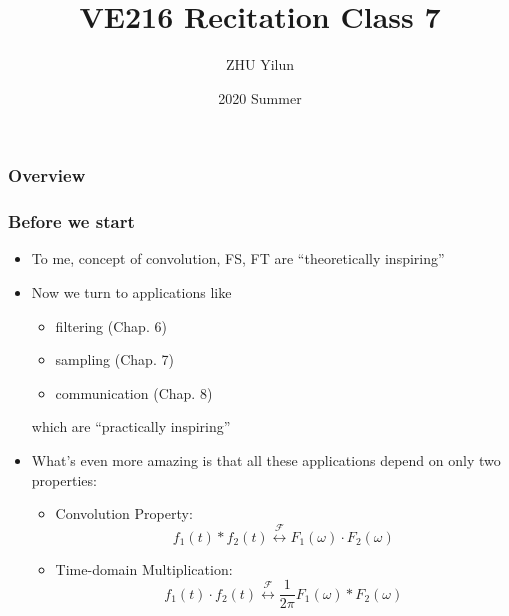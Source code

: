 \documentclass{beamer}
\title[VE216]{VE216 Recitation Class 7} %
\author{ZHU Yilun} %
\institute[SJTU] %
{
UM-SJTU Joint Institute \\ %
\medskip
\textit{VE216 SU20 TA Group} %
}
\date{2020 Summer} %
\begin{document}
\begin{frame}
\titlepage %
\end{frame}

\begin{frame}
\frametitle{Overview} %
\tableofcontents %
\end{frame}


\begin{frame}
    \frametitle{Before we start}
    \begin{itemize}
        \item To me, concept of convolution, FS, FT are ``theoretically inspiring''
        \item Now we turn to applications like 
        \begin{itemize}
            \item filtering (Chap. 6)
            \item sampling (Chap. 7)
            \item communication (Chap. 8)
        \end{itemize}
        which are ``practically inspiring''
        \item What's even more amazing is that all these applications depend on only two properties: 
        \begin{itemize}
            \item Convolution Property: \[f_1(t)* f_2(t) \stackrel{\mathscr{F}}{\longleftrightarrow} F_1(\omega) \cdot F_2(\omega)    \]
            \item Time-domain Multiplication: \[f_1(t)\cdot f_2(t) \stackrel{\mathscr{F}}{\longleftrightarrow} \frac{1}{2 \pi} F_1(\omega) * F_2(\omega)    \]
        \end{itemize}
    \end{itemize}
\end{frame}
\end{document}
